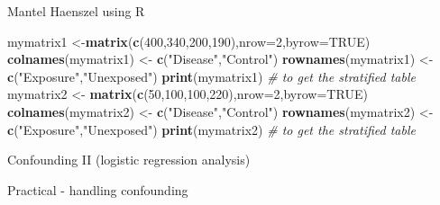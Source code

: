 \documentclass[ignorenonframetext,]{beamer}
\newenvironment{Shaded}{\begin{snugshade}}{\end{snugshade}}
\newcommand{\KeywordTok}[1]{\textcolor[rgb]{0.13,0.29,0.53}{\textbf{{#1}}}}
\newcommand{\DataTypeTok}[1]{\textcolor[rgb]{0.13,0.29,0.53}{{#1}}}
\newcommand{\DecValTok}[1]{\textcolor[rgb]{0.00,0.00,0.81}{{#1}}}
\newcommand{\StringTok}[1]{\textcolor[rgb]{0.31,0.60,0.02}{{#1}}}
\newcommand{\CommentTok}[1]{\textcolor[rgb]{0.56,0.35,0.01}{\textit{{#1}}}}
\newcommand{\OtherTok}[1]{\textcolor[rgb]{0.56,0.35,0.01}{{#1}}}
\newcommand{\NormalTok}[1]{{#1}}
\begin{document}
\begin{frame}[fragile]{Mantel Haenszel using R}

\begin{Shaded}
\begin{Highlighting}[]
\NormalTok{mymatrix1 <-}\KeywordTok{matrix}\NormalTok{(}\KeywordTok{c}\NormalTok{(}\DecValTok{400}\NormalTok{,}\DecValTok{340}\NormalTok{,}\DecValTok{200}\NormalTok{,}\DecValTok{190}\NormalTok{),}\DataTypeTok{nrow=}\DecValTok{2}\NormalTok{,}\DataTypeTok{byrow=}\OtherTok{TRUE}\NormalTok{) }
\KeywordTok{colnames}\NormalTok{(mymatrix1) <-}\StringTok{ }\KeywordTok{c}\NormalTok{(}\StringTok{"Disease"}\NormalTok{,}\StringTok{"Control"}\NormalTok{) }
\KeywordTok{rownames}\NormalTok{(mymatrix1) <-}\StringTok{ }\KeywordTok{c}\NormalTok{(}\StringTok{"Exposure"}\NormalTok{,}\StringTok{"Unexposed"}\NormalTok{) }
\KeywordTok{print}\NormalTok{(mymatrix1) }\CommentTok{# to get the stratified table}
\NormalTok{mymatrix2 <-}\StringTok{ }\KeywordTok{matrix}\NormalTok{(}\KeywordTok{c}\NormalTok{(}\DecValTok{50}\NormalTok{,}\DecValTok{100}\NormalTok{,}\DecValTok{100}\NormalTok{,}\DecValTok{220}\NormalTok{),}\DataTypeTok{nrow=}\DecValTok{2}\NormalTok{,}\DataTypeTok{byrow=}\OtherTok{TRUE}\NormalTok{) }
\KeywordTok{colnames}\NormalTok{(mymatrix2) <-}\StringTok{ }\KeywordTok{c}\NormalTok{(}\StringTok{"Disease"}\NormalTok{,}\StringTok{"Control"}\NormalTok{) }
\KeywordTok{rownames}\NormalTok{(mymatrix2) <-}\StringTok{ }\KeywordTok{c}\NormalTok{(}\StringTok{"Exposure"}\NormalTok{,}\StringTok{"Unexposed"}\NormalTok{) }
\KeywordTok{print}\NormalTok{(mymatrix2) }\CommentTok{# to get the stratified table}
\end{Highlighting}
\end{Shaded}

\end{frame}

\begin{frame}{Confounding II (logistic regression analysis)}

\end{frame}

\begin{frame}{Practical - handling confounding}

\end{frame}
\end{document}
